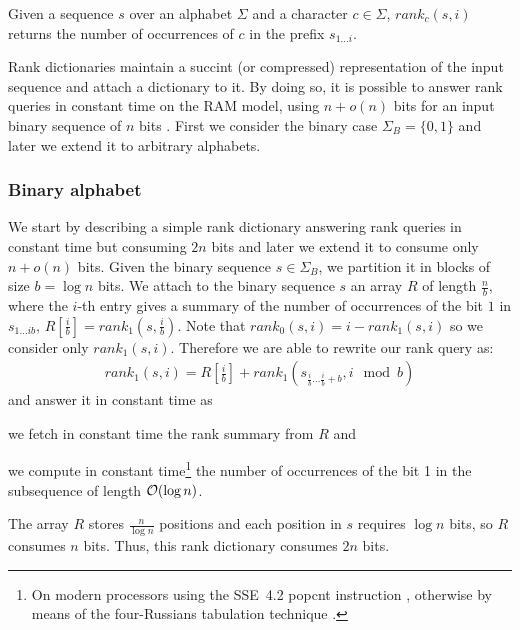 \begin{definition}
Given a sequence $s$ over an alphabet $\Sigma$ and a character $c \in \Sigma$, $rank_c(s, i)$ returns the number of occurrences of $c$ in the prefix $s_{1 \dots i}$.
\end{definition}

Rank dictionaries maintain a succint (or compressed) representation of the input sequence and attach a dictionary to it.
By doing so, it is possible to answer rank queries in constant time on the RAM model, using $n+o(n)$ bits for an input binary sequence of $n$ bits \citep{Jacobson1989}.
First we consider the binary case $\Sigma_B = \{ 0, 1 \}$ and later we extend it to arbitrary alphabets.

\subsubsection{Binary alphabet}

We start by describing a simple rank dictionary answering rank queries in constant time but consuming $2n$ bits and later we extend it to consume only $n + o(n)$ bits.
Given the binary sequence $s \in \Sigma_B$, we partition it in blocks of size $b=\log{n}$ bits.
We attach to the binary sequence $s$ an array $R$ of length $\frac{n}{b}$, where the $i$-th entry gives a summary of the number of occurrences of the bit $1$ in $s_{1 \dots i b}$, \ie $R[\frac{i}{b}] = rank_1(s, \frac{i}{b})$.
Note that $rank_0(s, i) = i - rank_1(s, i)$ so we consider only $rank_1(s, i)$.
Therefore we are able to rewrite our rank query as:
\begin{eqnarray}
rank_1(s,i) = R[\frac{i}{b}] + rank_1(s_{\frac{i}{b} \dots \frac{i}{b}+b}, i \mod{b})
\end{eqnarray}
and answer it in constant time as 
\begin{inparaenum}[(i)]
\item \label{itm:fetch} we fetch in constant time the rank summary from $R$ and
\item \label{itm:count} we compute in constant time\footnote{On modern processors using the SSE~4.2 popcnt instruction \citep{Intel}, otherwise by means of the four-Russians tabulation technique \citep{Arlazarov1975}.} the number of occurrences of the bit 1 in the subsequence of length $\mathcal{O}(\log{n})$.
\end{inparaenum}
The array $R$ stores $\frac{n}{\log{n}}$ positions and each position in $s$ requires $\log{n}$ bits, so $R$ consumes $n$ bits.
Thus, this rank dictionary consumes $2n$ bits.

